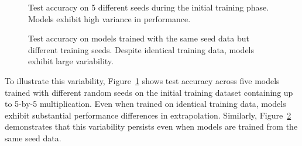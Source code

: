 \begin{figure}[ht!]
    \centering
    \hspace{1mm}
    \caption{Test accuracy on 5 different seeds during the initial training phase. Models exhibit high variance in performance.  }
    \label{fig:mult_has_high_variance1}
\end{figure}


\begin{figure}[ht!]
    \centering
    \hspace{1mm}
    \caption{Test accuracy on models trained with the same seed data but different training seeds. Despite identical training data, models exhibit large variability. }
    \label{fig:mult_has_high_variance2}
\end{figure}

To illustrate this variability, Figure~\ref{fig:mult_has_high_variance1} shows test accuracy across five models trained with different random seeds on the initial training dataset containing up to 5-by-5 multiplication. Even when trained on identical training data, models exhibit substantial performance differences in extrapolation. Similarly, Figure~\ref{fig:mult_has_high_variance2} demonstrates that this variability persists even when models are trained from the same seed data. 



